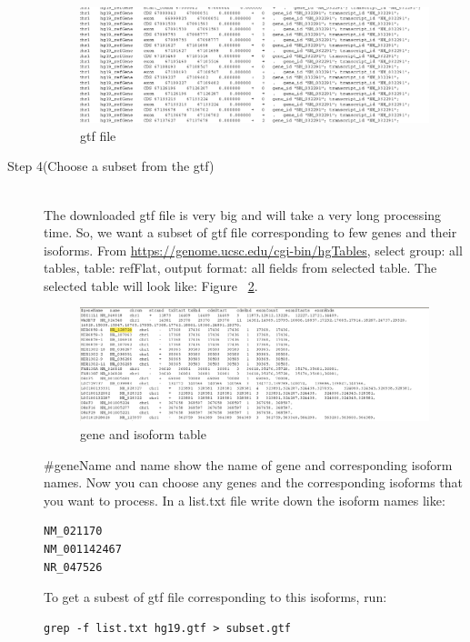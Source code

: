 \documentclass{article}
\begin{document}
\begin{description}
\begin{figure}[htpb]
\begin{center} 
\includegraphics[scale=0.4]{refgene.png}
\end{center}
\caption{ gtf file}
\label{fig:refgene}
\end{figure}


  \item[Step 4(Choose a subset from the gtf)]  \hfill \\
The downloaded gtf file is very big and will take a very long processing time. So, we want a subset of gtf file corresponding to few genes and their isoforms. From \url{https://genome.ucsc.edu/cgi-bin/hgTables}, select group: all tables, table: refFlat, output format: all fields from selected table.
The selected table will look like:
Figure ~\ref{fig:isoform}.

\begin{figure}[htpb]
\begin{center} 
\includegraphics[scale=0.4]{isoform.png}
\end{center}
\caption{ gene and isoform table}
\label{fig:isoform}
\end{figure}
\#geneName and name show the name of gene and corresponding isoform names. Now you can choose any genes and the corresponding isoforms that you want to process. In a list.txt file write down the isoform names like:
\begin{verbatim}
NM_021170
NM_001142467
NR_047526
\end{verbatim}
To get a subest of gtf file corresponding to this isoforms, run:
\begin{verbatim}
grep -f list.txt hg19.gtf > subset.gtf
\end{verbatim}


\end{description}
\end{document}
